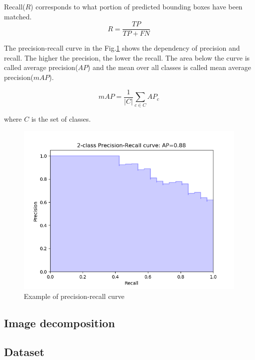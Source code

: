 \documentclass[a4paper,12pt,titlepage, twoside]{article}
\numberwithin{figure}{section}
\begin{document}
Recall($R$) corresponds to what portion of predicted bounding boxes have been matched. 
\begin{equation}
R = \frac{TP}{TP + FN}
\end{equation}

The precision-recall curve in the Fig.\ref{fig:precision-recall} shows the dependency of precision and recall. The higher the precision, the lower the recall. The area below the curve is called average precision($AP$) and the mean over all classes is called mean average precision($mAP$).

\begin{equation}
mAP = \frac{1}{|C|} \sum_{c \in C} AP_c
\end{equation}

where $C$ is the set of classes.

\begin{figure}[H]
\centering
\includegraphics[width=1\linewidth]{fig/precision-recall.png}
\caption{Example of precision-recall curve}
\label{fig:precision-recall}
\end{figure}







\subsection{Image decomposition}
\label{sec:decomposition}

\subsection{Dataset}
\label{sec:ssd-dataset}
\end{document}
